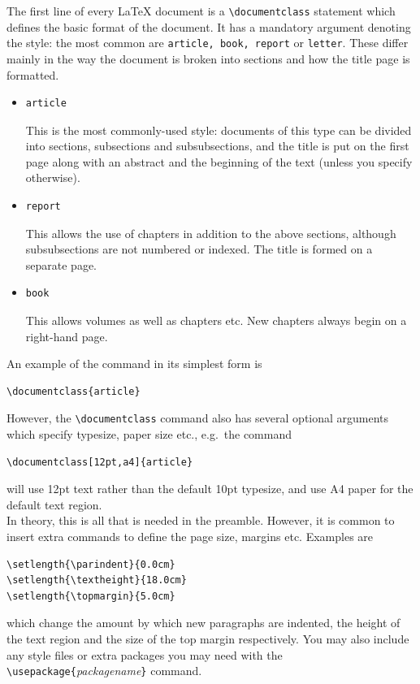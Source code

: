 \documentclass[11pt]{article}
\newcommand{\bi}{\begin{itemize}}
\newcommand{\ei}{\end{itemize}}
\newcommand{\lx}{{\LaTeX} }
\begin{document}
The first line of  every \lx document is a 
\verb+\documentclass+
statement which defines the basic format of
the document. It has a mandatory argument denoting the style: the
most common are \verb+article, book, report+ or \verb+letter+. 
These differ mainly in the way the document is broken into sections and how the title page is formatted.
\bi
\item \begin{verbatim}article\end{verbatim}  This is the most commonly-used style: documents of this type
can be divided into sections, subsections and subsubsections, and the 
title is put on the first page along with an abstract and the beginning
 of the text (unless you specify otherwise).
\item \begin{verbatim}report\end{verbatim}  This allows the use of chapters in addition to the above sections,
 although subsubsections are not numbered or indexed. The title is formed 
on a separate page. 
\item \begin{verbatim}book\end{verbatim}  This allows volumes as well as chapters etc. New chapters 
always begin on a right-hand page.
\ei

An example of the command in its simplest form is
\begin{verbatim} 
\documentclass{article}
\end{verbatim} 
However, the \verb+\documentclass+ command also has several optional arguments
which specify typesize, paper size etc., e.g.\ the command
\begin{verbatim} 
\documentclass[12pt,a4]{article}
\end{verbatim} 
will use 12pt text rather than the default 10pt typesize, and use A4 paper for the 
default text region.\\

In theory, this is all that is needed in the preamble. However, it is common
to insert extra commands to define the page size, margins etc. Examples are
\begin{verbatim} 
\setlength{\parindent}{0.0cm}
\setlength{\textheight}{18.0cm}
\setlength{\topmargin}{5.0cm}
\end{verbatim} 
which change the amount by which new paragraphs are indented, the height of
the text region and the size of the top margin respectively. You
may also include any style files or extra packages you may need
with the \verb+\usepackage{+\textit{packagename}\verb+}+ command.\\
\end{document}
